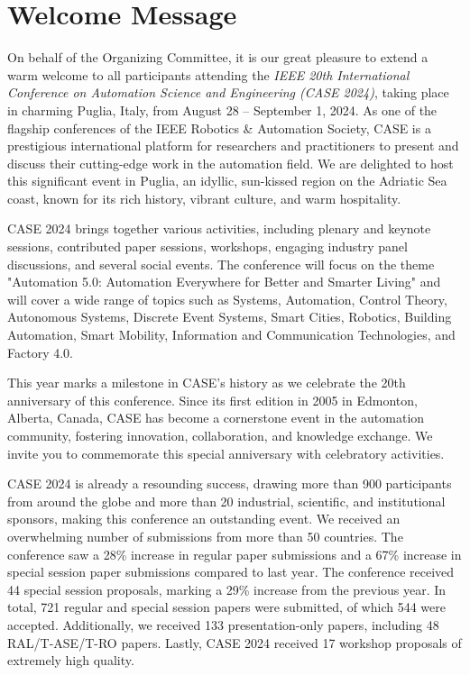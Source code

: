 \documentclass[
	openany, %
	parskip=full, %
	12pt, %
	a4paper, %
]{conferencebooklet} %
\begin{document}
\chapter{Welcome Message}
On behalf of the Organizing Committee, it is our great pleasure to extend a warm welcome to all participants attending the \textit{IEEE 20th International Conference on Automation Science and Engineering (CASE 2024)}, taking place in charming Puglia, Italy, from August 28 – September 1, 2024. As one of the flagship conferences of the IEEE Robotics \& Automation Society, CASE is a prestigious international platform for researchers and practitioners to present and discuss their cutting-edge work in the automation field. We are delighted to host this significant event in Puglia, an idyllic, sun-kissed region on the Adriatic Sea coast, known for its rich history, vibrant culture, and warm hospitality.

CASE 2024 brings together various activities, including plenary and keynote sessions, contributed paper sessions, workshops, engaging industry panel discussions, and several social events. The conference will focus on the theme "Automation 5.0: Automation Everywhere for Better and Smarter Living" and will cover a wide range of topics such as Systems, Automation, Control Theory, Autonomous Systems, Discrete Event Systems, Smart Cities, Robotics, Building Automation, Smart Mobility, Information and Communication Technologies, and Factory 4.0.

This year marks a milestone in CASE's history as we celebrate the 20th anniversary of this conference. Since its first edition in 2005 in Edmonton, Alberta, Canada, CASE has become a cornerstone event in the automation community, fostering innovation, collaboration, and knowledge exchange. We invite you to commemorate this special anniversary with celebratory activities.

CASE 2024 is already a resounding success, drawing more than 900 participants from around the globe and more than 20 industrial, scientific, and institutional sponsors, making this conference an outstanding event. We received an overwhelming number of submissions from more than 50 countries. The conference saw a 28\% increase in regular paper submissions and a 67\% increase in special session paper submissions compared to last year. The conference received 44 special session proposals, marking a 29\% increase from the previous year. In total, 721 regular and special session papers were submitted, of which 544 were accepted. Additionally, we received 133 presentation-only papers, including 48 RAL/T-ASE/T-RO papers. Lastly, CASE 2024 received 17 workshop proposals of extremely high quality.
\end{document}

